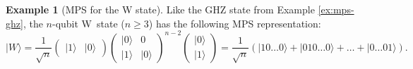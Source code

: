 \documentclass[aps,pra,12pt,nofootinbib,superscriptaddress,longbibliography]{revtex4-1}
\theoremstyle{plain}
\theoremstyle{definition}
\newtheorem{example}[theorem]{Example}
\newcommand{\ket}[1]{\mbox{$|#1\rangle$}}
\newcommand{\be}{\begin{equation}}
\newcommand{\ee}{\end{equation}}
\begin{document}
\begin{example}[MPS for the W state]\label{ex:w-state}
Like the GHZ state from Example \ref{ex:mps-ghz}, the $n$-qubit W~state ($n\geq 3$) has the following MPS representation:
\be\label{eqn:wnMPS}
\ket{W}
=
\frac{1}{\sqrt{n}}
\begin{pmatrix} \ket{1} & \ket{0} \end{pmatrix}
\left( \begin{array}{cc}
\ket{0} & 0 \\
\ket{1} & \ket{0} \end{array} \right)^{n-2}
\begin{pmatrix} \ket{0}\\ \ket{1} \end{pmatrix}
=
\frac{1}{\sqrt{n}} \left(
\ket{10\ldots 0}+\ket{010\ldots 0}+\ldots +\ket{0\ldots 01}
\right).
\ee
\end{example}
\end{document}
